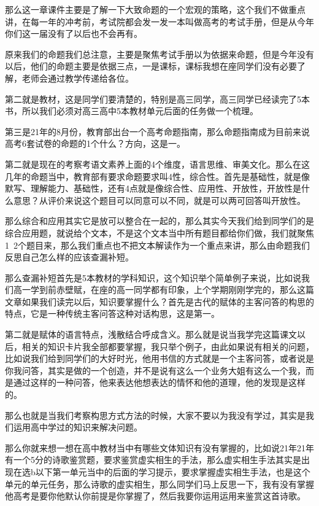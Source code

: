\documentclass{ctexart}
\renewcommand{\\}{\par}
\begin{document}
那么这一章课件主要是了解一下大致命题的一个宏观的策略，这个我们不做重点讲，在每一年的冲考前，考试院都会发一发一本叫做高考的考试手册，但是从今年你们这一届没有了以后也不会再有。

原来我们的命题我们总注意，主要是聚焦考试手册以为依据来命题，但是今年没有以后，他们的命题主要是依据三点，一是课标，课标我想在座同学们没有必要了解，老师会通过教学传递给各位。

第二就是教材，这是同学们要清楚的，特别是高三同学，高三同学已经读完了5本书，所以我们必须对高三高中5本教材单元后面的任务做一个梳理。

第三是21年的8月份，教育部出台一个高考命题指南，那么命题指南成为目前来说高考6套试卷的命题的1个什么？方向，这是一。

第二就是现在的考察考语文素养上面的4个维度，语言思维、审美文化。那么在这几年的命题当中，教育部有要求命题要求叫4性，综合性。首先是基础性，就是像默写、理解能力、基础性，还有4点就是像综合性、应用性、开放性，开放性是什么意思？从评价来说这个题目可以同意可以不同，就是可以两可回答叫开放性。

那么综合和应用其实它是放可以整合在一起的，那么其实今天我们给到同学们的是综合应用题，就说给个文本，不是这个文本当中所有题目都给你们做，我们就聚焦1~2个题目来，那么我们重点也不把文本解读作为一个重点来讲，那么由命题我们反思自己怎么样的应该查漏补短。

那么查漏补短首先是5本教材的学科知识，这个知识举个简单例子来说，比如说我们高一学到前赤壁赋，在座的高一同学都有印象，上个学期刚刚学完的，那么这篇文章如果我们读完以后，知识要掌握什么？首先是古代的赋体的主客问答的构思的特点，它是一种传统主客问答这种对话构思，这是第一。

第二就是赋体的语言特点，浅散结合呼成含义。那么就是说当我学完这篇课文以后，相关的知识卡片我全部都要掌握，我只举个例子，由此如果说有相关的问题，比如说我们给到同学们的大好时光，他用书信的方式就是一个主客问答，或者说是你我问答，其实是做的一个创造，并不是说有这么一个业务大姐有这么一个我，而是通过这样的一种问答，他来表达他想表达的情怀和他的道理，他的发现是这样的。

那么也就是当我们考察构思方式方法的时候，大家不要以为我没有学过，其实是我们运用高中学过的知识来解决问题。

那么你就来想一想在高中教材当中有哪些文体知识有没有掌握的，比如说21年21年有一个5分的诗歌鉴赏题，要求鉴赏虚实相生的手法，那么虚实相生手法其实是出现在选b以下第一单元当中的后面的学习提示，要求掌握虚实相生手法，也是这个单元的单元任务，那么诗歌的虚实相生，那么同学们马上反思一下，我有没有掌握他高考是要你他默认你前提是你掌握了，然后我要你运用运用来鉴赏这首诗歌。
\end{document}
